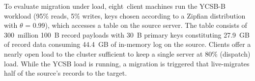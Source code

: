 %


To evaluate migration under load, eight~client machines run the YCSB-B~\cite{ycsb}
workload (95\% reads, 5\% writes, keys chosen according to a Zipfian
distribution with $\theta$ = 0.99), which accesses a table on the source
server. The table consists of 300~million 100~B record payloads with 30~B
primary keys constituting 27.9~GB of record data consuming 44.4~GB of in-memory
log on the source. Clients offer a nearly open load to the cluster sufficient to keep
a single server at 80\% (dispatch) load.  While the YCSB load is running, a
migration is triggered that live-migrates half of the source's records
to the target.

